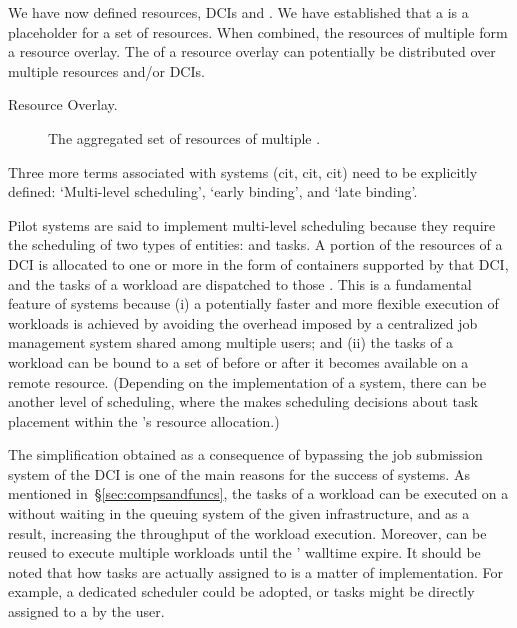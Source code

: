 \documentclass{sig-alternate}
\begin{document}
We have now defined resources, DCIs and \pilots. We have established that a
\pilot is a placeholder for a set of resources. When combined, the resources of
multiple \pilots form a resource overlay. The \pilots of a resource overlay can
potentially be distributed over multiple resources and/or DCIs.


\begin{description}
\item[Resource Overlay.] The aggregated set of resources of multiple \pilots.
\end{description}

Three more terms associated with \pilot systems (cit, cit, cit) need to be
explicitly defined: `Multi-level scheduling', `early binding', and `late
binding'.

Pilot systems are said to implement multi-level scheduling because they require
the scheduling of two types of entities: \pilots and tasks. A portion of the
resources of a DCI is allocated to one or more \pilots in the form of
containers supported by that DCI, and the tasks of a workload are dispatched to
those \pilots. This is a fundamental feature of \pilot systems because (i) a
potentially faster and more flexible execution of workloads is achieved by
avoiding the overhead imposed by a centralized job management system shared
among multiple users; and (ii) the tasks of a workload can be bound to a set of
\pilots before or after it becomes available on a remote resource.  (Depending
on the implementation of a \pilot system, there can be another level of
scheduling, where the \pilot makes scheduling decisions about task placement
within the \pilot's resource allocation.)

The simplification obtained as a consequence of bypassing the job submission
system of the DCI is one of the main reasons for the success of \pilot
systems. As mentioned in~\S\ref{sec:compsandfuncs}, the tasks of a workload can
be executed on a \pilot without waiting in the queuing system of the given
infrastructure, and as a result, increasing the throughput of the workload
execution. Moreover, \pilots can be reused to execute multiple workloads until
the \pilots' walltime expire.  It should be noted that how tasks are actually
assigned to \pilots is a matter of implementation. For example, a dedicated
scheduler could be adopted, or tasks might be directly assigned to a \pilot by
the user.
\end{document}
